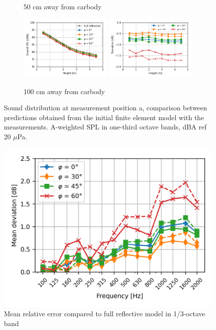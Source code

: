 \begin{figure}[H]
\begin{subfigure}[b]{\textwidth}
		\caption{50 cm away from carbody}
	\end{subfigure}
	\begin{subfigure}[b]{\textwidth}
		\centering
		\includegraphics[width=0.49\textwidth]{fig/chap5/impedance/overall_SPL/overall_SPL_pos_g.png}
		\includegraphics[width=0.49\textwidth]{fig/chap5/impedance/overall_SPL/deviation_pos_g.png}
		\caption{100 cm away from carbody}
	\end{subfigure}
	
	\caption{Sound distribution at measurement position a, comparison between predictions obtained from the initial finite element model with the measurements. A-weighted SPL in one-third octave bands, dBA ref 20 $\mu$Pa.}
	\label{fig:overall_SPL_impedance}
\end{figure}

\begin{figure}[H]
	\centering
	\includegraphics[width=0.7\linewidth]{fig/chap5/impedance/freq_spectrum/average_gap.png}
	\caption{Mean relative error compared to full reflective model in 1/3-octave band}
	\label{fig:gap_freq_spectrum_impedance}
\end{figure}


